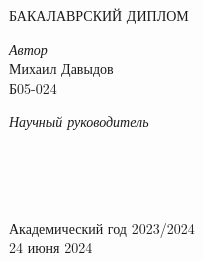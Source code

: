 \documentclass[
11pt, %
english, %
singlespacing, %
headsepline, %
]{MastersDoctoralThesis} %
\theoremstyle{plain}
\theoremstyle{definition}
\theoremstyle{remark}
\begin{document}
\begin{titlepage}
\begin{center}
		{БАКАЛАВРСКИЙ ДИПЛОМ}\vspace{1cm} %
		
		\begin{minipage}[t]{0.4\textwidth}
			\begin{flushleft} \large
				\emph{Автор}\\ 
				{Михаил Давыдов \\ Б05-024} %
			\end{flushleft}
		\end{minipage}
		\begin{minipage}[t]{0.4\textwidth}
			\begin{flushright} \large
				\emph{Научный руководитель} \\
				{\supname} \\ %
			\end{flushright}
		\end{minipage}\\[2cm]
		
		\vfill
		
		
		\vfill
		\HRule \\[1cm] %
		{\large Академический год 2023/2024 \\ 24 июня 2024}\\[4cm] %
		
		\vfill
	\end{center}
\end{titlepage}

\clearpage

\end{document}
